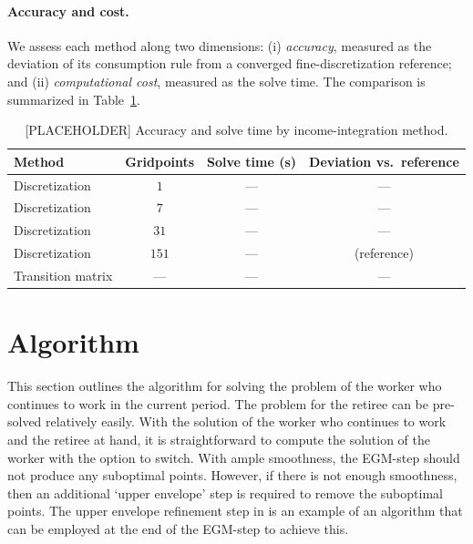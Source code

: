 \documentclass[11pt]{article}
\begin{document}
\paragraph{Accuracy and cost.}
We assess each method along two dimensions: (i) \emph{accuracy}, measured as the deviation
of its consumption rule from a converged fine-discretization reference; and (ii)
\emph{computational cost}, measured as the solve time. The comparison is summarized in
Table~\ref{tab:incdisc}.
\begin{table}[htbp]
\centering
\caption{[PLACEHOLDER] Accuracy and solve time by income-integration method.}
\label{tab:incdisc}
\begin{tabular}{lccc}
\toprule
Method & Gridpoints & Solve time (s) & Deviation vs.\ reference \\
\midrule
Discretization    & $1$   & --- & --- \\
Discretization    & $7$   & --- & --- \\
Discretization    & $31$  & --- & --- \\
Discretization    & $151$ & --- & (reference) \\
Transition matrix & ---   & --- & --- \\
\bottomrule
\end{tabular}
\end{table}


\section{Algorithm}
This section outlines the algorithm for solving the problem of the worker who continues
to work in the current period. The problem for the retiree can be pre-solved relatively
easily. With the solution of the worker who continues to work and the retiree at hand,
it is straightforward to compute the solution of the worker with the option to switch.
With ample smoothness, the EGM-step should not produce any suboptimal points.
However, if there is not enough smoothness, then an additional `upper envelope' step
is required to remove the suboptimal points. The upper envelope refinement step in
\citet{ijrs2017} is an example of an algorithm that
can be employed at the end of the EGM-step to achieve this.
\end{document}
